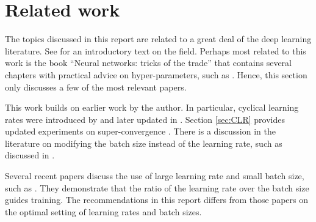 \documentclass{article} %
\newcommand{\etal}{\emph{et al. }}
\begin{document}

\section{Related work}
\label{sec:related}

The topics discussed in this report are related to a great deal of the deep learning literature.  See \cite{goodfellow2016deep} for an introductory text on the field.  Perhaps most related to this work is the book ``Neural networks: tricks of the trade'' \citep{orr2003neural} that contains several chapters with practical advice on hyper-parameters, such as \cite{bengio2012practical}.  Hence, this section only discusses a few of the most relevant papers.

This work builds on earlier work by the author.  In particular, cyclical learning rates were introduced by \cite{smith2015no} and later updated in \cite{smith2017cyclical}.  Section \ref{sec:CLR} provides updated experiments on super-convergence \citep{smith2017super}.  There is a discussion in the literature on modifying  the batch size instead of the learning rate, such as discussed in \cite{smith2017don}.  


Several recent papers discuss the use of large learning rate and small batch size, such as \cite{jastrzebski2017residual,jastrzkebski2017three,xing2018walk}.  They demonstrate that the ratio of the learning rate over the batch size guides training.  The recommendations in this report differs from those papers on the optimal setting of learning rates and batch sizes.
\end{document}
